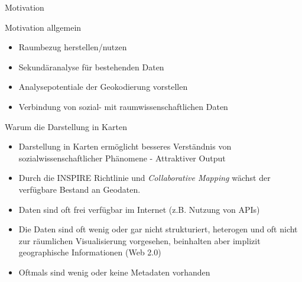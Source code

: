 \documentclass[ignorenonframetext,]{beamer}
\providecommand{\tightlist}{%
  \setlength{\itemsep}{0pt}\setlength{\parskip}{0pt}}
\begin{document}
\begin{frame}{Motivation}

\begin{block}{Motivation allgemein}

\begin{itemize}
\tightlist
\item
  Raumbezug herstellen/nutzen
\item
  Sekundäranalyse für bestehenden Daten
\item
  Analysepotentiale der Geokodierung vorstellen
\item
  Verbindung von sozial- mit raumwissenschaftlichen Daten
\end{itemize}

\end{block}

\begin{block}{Warum die Darstellung in Karten}

\begin{itemize}
\item
  Darstellung in Karten ermöglicht besseres Verständnis von
  sozialwissenschaftlicher Phänomene - Attraktiver Output
\item
  Durch die INSPIRE Richtlinie und \emph{Collaborative Mapping} wächst
  der verfügbare Bestand an Geodaten.
\item
  Daten sind oft frei verfügbar im Internet (z.B. Nutzung von APIs)
\item
  Die Daten sind oft wenig oder gar nicht strukturiert, heterogen und
  oft nicht zur räumlichen Visualisierung vorgesehen, beinhalten aber
  implizit geographische Informationen (Web 2.0)
\item
  Oftmals sind wenig oder keine Metadaten vorhanden
\end{itemize}

\end{block}

\end{frame}
\end{document}
